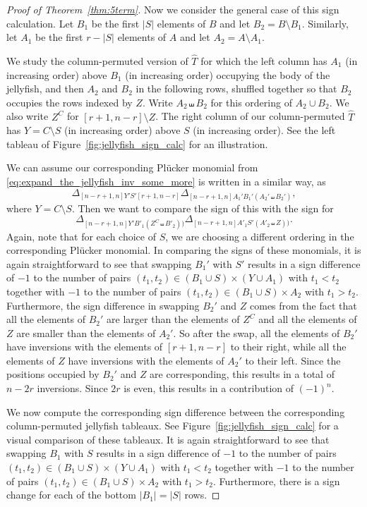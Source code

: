 \begin{proof}[Proof of Theorem~\ref{thm:5term}]
Now we consider the general case of this sign calculation. 
Let $B_1$ be the first $|S|$ elements of $B$ and let $B_2 = B \setminus B_1$. Similarly, let $A_1$ be the first $r - |S|$ elements of $A$ and let $A_2 = A \setminus A_1$.

We study the column-permuted version of $\widehat{T}$ for which the left column has $A_1$ (in increasing order) above $B_1$ (in increasing order) occupying the body of the jellyfish, and then $A_2$ and $B_2$ in the following rows, shuffled together so that $B_2$ occupies the rows indexed by $Z$. Write $A_2 \shuffle B_2$ for this ordering of $A_2 \cup B_2$. We also write $Z^C$ for $[r+1,n-r] \setminus Z$. The right column of our column-permuted $\widehat{T}$ has $Y = C \setminus S$ (in increasing order) above $S$ (in increasing order). See the left tableau of Figure~\ref{fig:jellyfish_sign_calc} for an illustration.

We can assume our corresponding Pl\"ucker monomial from \eqref{eq:expand_the_jellyfish_inv_some_more} is written in a similar way, as \[
\Delta_{[n-r+1,n]  Y'S' [r+1,n-r]} \Delta_{[n-r+1,n]  A_1'B_1' (A_2' \shuffle B_2')},
\]
where $Y = C \setminus S$. Then we want to compare the sign of this with the sign for
\[
\Delta_{[n-r+1,n]Y'B'_1(Z^C \shuffle B'_2))} \Delta_{[n-r+1,n]A'_1S'(A'_2 \shuffle Z))}.
\]
Again, note that for each choice of $S$, we are choosing a different ordering in the corresponding Pl\"ucker monomial. 
In comparing the signs of these monomials, it is again straightforward to see that swapping $B_1'$ with $S'$ results in a sign difference of $-1$ to the number of pairs $(t_1, t_2) \in (B_1 \cup S) \times (Y \cup A_1)$ with $t_1 < t_2$ together with $-1$ to the number of pairs $(t_1, t_2) \in (B_1 \cup S) \times A_2$ with $t_1 > t_2$. 
Furthermore, the sign difference in swapping $B_2'$ and $Z$ comes from the fact that all the elements of $B_2'$ are larger than the elements of $Z^C$ and all the elements of $Z$ are smaller than the elements of $A_2'$. So after the swap, all the elements of $B_2'$ have inversions with  the elements of $[r+1,n-r]$ to their right, while all the elements of $Z$ have inversions with the elements of $A_2'$ to their left. Since the positions occupied by $B_2'$ and $Z$ are corresponding, this results in a total of $n-2r$ inversions. Since $2r$ is even, this results in a contribution of $(-1)^n$.

We now compute the corresponding sign difference between the corresponding column-permuted jellyfish tableaux. See Figure~\ref{fig:jellyfish_sign_calc} for a visual comparison of these tableaux. It is again straightforward to see that swapping $B_1$ with $S$ results in a sign difference of $-1$ to the number of pairs $(t_1, t_2) \in (B_1 \cup S) \times (Y \cup A_1)$ with $t_1 < t_2$ together with $-1$ to the number of pairs $(t_1, t_2) \in (B_1 \cup S) \times A_2$ with $t_1 > t_2$. Furthermore, there is a sign change for each of the bottom $|B_1| = |S|$ rows.


\end{proof}
